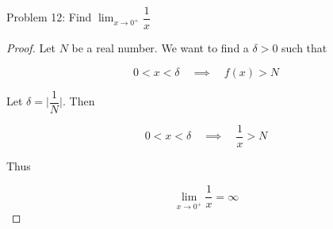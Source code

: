 \usepackage{amsthm}

Problem 12: Find $\lim_{x \rightarrow 0^+} \dfrac{1}{x}$

\begin{proof}
Let $N$ be a real number. We want to find a $\delta > 0$ such that

$$ 0 < x < \delta \quad \implies \quad f(x) > N $$

Let $\delta = \Big|\dfrac{1}{N}\Big|$. Then

$$ 0 < x < \delta \quad \implies \quad \frac{1}{x} > N$$

Thus 

$$ \lim_{x \rightarrow 0^+} \frac{1}{x} = \infty $$
\end{proof}
